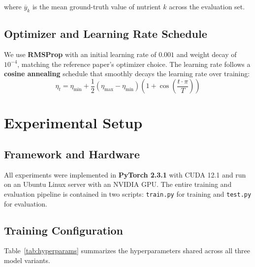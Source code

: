 \documentclass[11pt,a4paper]{article}
\begin{document}
where $\overline{y}_k$ is the mean ground-truth value of nutrient $k$ across the evaluation set.

\subsection{Optimizer and Learning Rate Schedule}

We use \textbf{RMSProp} \cite{hinton2012} with an initial learning rate of $0.001$ and weight decay of $10^{-4}$, matching the reference paper's optimizer choice. The learning rate follows a \textbf{cosine annealing} schedule \cite{loshchilov2017} that smoothly decays the learning rate over training:
\begin{equation}
  \eta_t = \eta_{\min} + \frac{1}{2}(\eta_{\max} - \eta_{\min})\left(1 + \cos\left(\frac{t \cdot \pi}{T}\right)\right)
\end{equation}

\section{Experimental Setup}
\label{sec:setup}

\subsection{Framework and Hardware}

All experiments were implemented in \textbf{PyTorch 2.3.1} with CUDA 12.1 and run on an Ubuntu Linux server with an NVIDIA GPU. The entire training and evaluation pipeline is contained in two scripts: \texttt{train.py} for training and \texttt{test.py} for evaluation.

\subsection{Training Configuration}

Table~\ref{tab:hyperparams} summarizes the hyperparameters shared across all three model variants.
\end{document}
